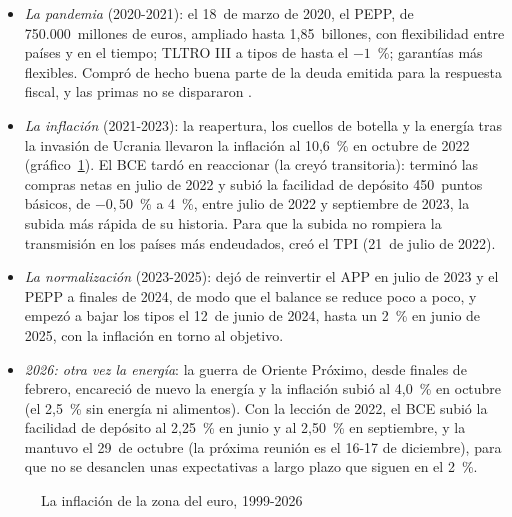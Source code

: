 \documentclass[11pt]{article}
\begin{document}
\begin{itemize}
\item \emph{La pandemia} (2020-2021): el 18~de marzo de 2020, el PEPP, de 750.000~millones de euros, ampliado hasta 1,85~billones, con flexibilidad entre países y en el tiempo; TLTRO III a tipos de hasta el $-1$~\%; garantías más flexibles. Compró de hecho buena parte de la deuda emitida para la respuesta fiscal, y las primas no se dispararon \nocite{BCE2020PEPP}.
\item \emph{La inflación} (2021-2023): la reapertura, los cuellos de botella y la energía tras la invasión de Ucrania llevaron la inflación al 10,6~\% en octubre de 2022 (gráfico~\ref{fig:inflacion}). El BCE tardó en reaccionar (la creyó transitoria): terminó las compras netas en julio de 2022 y subió la facilidad de depósito 450~puntos básicos, de $-0{,}50$~\% a 4~\%, entre julio de 2022 y septiembre de 2023, la subida más rápida de su historia. Para que la subida no rompiera la transmisión en los países más endeudados, creó el TPI (21~de julio de 2022).
\item \emph{La normalización} (2023-2025): dejó de reinvertir el APP en julio de 2023 y el PEPP a finales de 2024, de modo que el balance se reduce poco a poco, y empezó a bajar los tipos el 12~de junio de 2024, hasta un 2~\% en junio de 2025, con la inflación en torno al objetivo.
\item \emph{2026: otra vez la energía}: la guerra de Oriente Próximo, desde finales de febrero, encareció de nuevo la energía y la inflación subió al 4,0~\% en octubre (el 2,5~\% sin energía ni alimentos)\nocite{Eurostat2026IAPCoct}. Con la lección de 2022, el BCE subió la facilidad de depósito al 2,25~\% en junio y al 2,50~\% en septiembre, y la mantuvo el 29~de octubre (la próxima reunión es el 16-17 de diciembre), para que no se desanclen unas expectativas a largo plazo que siguen en el 2~\%\nocite{BCE2026Decisiones}.
\end{itemize}

\begin{figure}[H]
\centering
\caption{La inflación de la zona del euro, 1999-2026}\label{fig:inflacion}
\end{figure}
\end{document}
